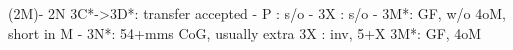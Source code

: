 (2M)- 2N
3C*->3D*: transfer accepted
        - P  : s/o
        - 3X : s/o
        - 3M*: GF, w/o 4oM, short in M
        - 3N*: 54+mms CoG, usually extra
3X : inv, 5+X
3M*: GF, 4oM
